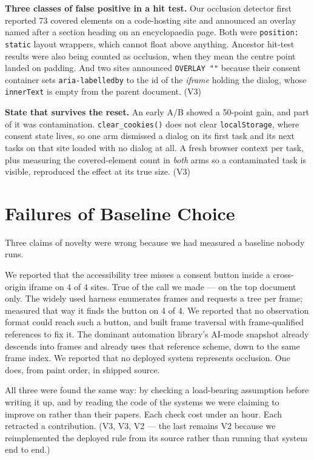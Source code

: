 \documentclass[conference]{IEEEtran}
\begin{document}
\textbf{Three classes of false positive in a hit test.} Our occlusion detector
first reported 73 covered elements on a code-hosting site and announced an
overlay named after a section heading on an encyclopaedia page. Both were
\texttt{position: static} layout wrappers, which cannot float above anything.
Ancestor hit-test results were also being counted as occlusion, when they mean
the centre point landed on padding. And two sites announced \texttt{OVERLAY ""}
because their consent container sets \texttt{aria-labelledby} to the id of the
\emph{iframe} holding the dialog, whose \texttt{innerText} is empty from the
parent document. (V3)

\textbf{State that survives the reset.} An early A/B showed a 50-point gain,
and part of it was contamination. \texttt{clear\_cookies()} does not clear
\texttt{localStorage}, where consent state lives, so one arm dismissed a dialog
on its first task and its next tasks on that site loaded with no dialog at all.
A fresh browser context per task, plus measuring the covered-element count in
\emph{both} arms so a contaminated task is visible, reproduced the effect at
its true size. (V3)

\section{Failures of Baseline Choice}

Three claims of novelty were wrong because we had measured a baseline nobody
runs.

We reported that the accessibility tree misses a consent button inside a
cross-origin iframe on 4 of 4 sites. True of the call we made --- on the top
document only. The widely used harness enumerates frames and requests a tree
per frame; measured that way it finds the button on 4 of 4. We reported that no
observation format could reach such a button, and built frame traversal with
frame-qualified references to fix it. The dominant automation library's
AI-mode snapshot already descends into frames and already uses that reference
scheme, down to the same frame index. We reported that no deployed system
represents occlusion. One does, from paint order, in shipped source.

All three were found the same way: by checking a load-bearing assumption before
writing it up, and by reading the code of the systems we were claiming to
improve on rather than their papers. Each check cost under an hour. Each
retracted a contribution. (V3, V3, V2 --- the last remains V2 because we
reimplemented the deployed rule from its source rather than running that system
end to end.)
\end{document}
